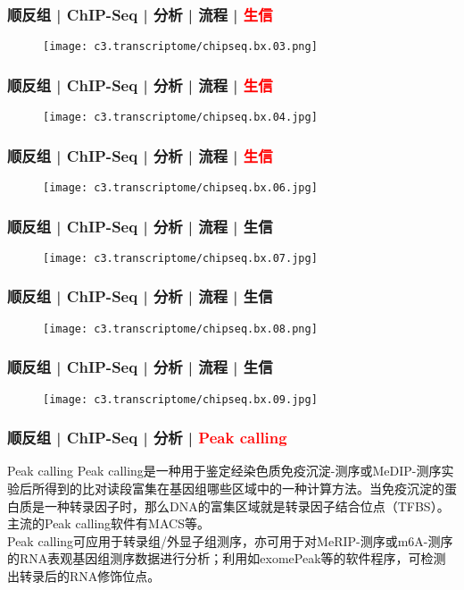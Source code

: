 \begin{frame}
  \frametitle{顺反组 | ChIP-Seq | 分析 | 流程 | \textcolor{red}{生信}}
  \begin{figure}
    \centering
    \texttt{[image: c3.transcriptome/chipseq.bx.03.png]}
  \end{figure}
\end{frame}

\begin{frame}
  \frametitle{顺反组 | ChIP-Seq | 分析 | 流程 | \textcolor{red}{生信}}
  \begin{figure}
    \centering
    \texttt{[image: c3.transcriptome/chipseq.bx.04.jpg]}
  \end{figure}
\end{frame}

\begin{frame}
  \frametitle{顺反组 | ChIP-Seq | 分析 | 流程 | \textcolor{red}{生信}}
  \begin{figure}
    \centering
    \texttt{[image: c3.transcriptome/chipseq.bx.06.jpg]}
  \end{figure}
\end{frame}

\begin{frame}
  \frametitle{顺反组 | ChIP-Seq | 分析 | 流程 | 生信}
  \begin{figure}
    \centering
    \texttt{[image: c3.transcriptome/chipseq.bx.07.jpg]}
  \end{figure}
\end{frame}

\begin{frame}
  \frametitle{顺反组 | ChIP-Seq | 分析 | 流程 | 生信}
  \begin{figure}
    \centering
    \texttt{[image: c3.transcriptome/chipseq.bx.08.png]}
  \end{figure}
\end{frame}

\begin{frame}
  \frametitle{顺反组 | ChIP-Seq | 分析 | 流程 | 生信}
  \begin{figure}
    \centering
    \texttt{[image: c3.transcriptome/chipseq.bx.09.jpg]}
  \end{figure}
\end{frame}

\begin{frame}
  \frametitle{顺反组 | ChIP-Seq | 分析 | \textcolor{red}{Peak calling}}
  \begin{block}{Peak calling}
    Peak calling是一种用于鉴定经染色质免疫沉淀-测序或MeDIP-测序实验后所得到的比对读段富集在基因组哪些区域中的一种计算方法。当免疫沉淀的蛋白质是一种转录因子时，那么DNA的富集区域就是转录因子结合位点（TFBS）。主流的Peak calling软件有MACS等。\\
    \vspace{1em}
    Peak calling可应用于转录组/外显子组测序，亦可用于对MeRIP-测序或m6A-测序的RNA表观基因组测序数据进行分析；利用如exomePeak等的软件程序，可检测出转录后的RNA修饰位点。
  \end{block}
\end{frame}

